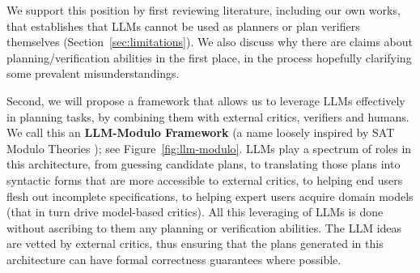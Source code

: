 \documentclass{article}
\newcommand{\rao}[1]{\noindent\textcolor{red}{#1}}
\theoremstyle{plain}
\theoremstyle{definition}
\theoremstyle{remark}
\begin{document}
We support this position by first reviewing literature, including our
own works, that establishes that LLMs cannot be used as planners or plan verifiers themselves (Section~\ref{sec:limitations}). We also discuss why there are claims about planning/verification abilities in the first place, in the process hopefully clarifying some prevalent misunderstandings. 


Second, we will propose a framework that allows us to leverage LLMs effectively in planning tasks, by combining them with external critics, verifiers and humans. We call this an {\bf LLM-Modulo Framework} (a name loosely inspired by SAT Modulo Theories \cite{sat-modulo}); see Figure~\ref{fig:llm-modulo}. LLMs play a spectrum of roles in this architecture, from guessing candidate plans, to translating those plans into syntactic forms that are more accessible to external critics, to helping end users flesh out incomplete specifications, to helping expert users acquire domain models (that in turn drive model-based critics). All this leveraging of LLMs is done without ascribing to them any planning or verification abilities. The LLM ideas are vetted by external critics, thus ensuring that the plans generated in this architecture can have formal correctness guarantees where possible. 












%
%
\end{document}
